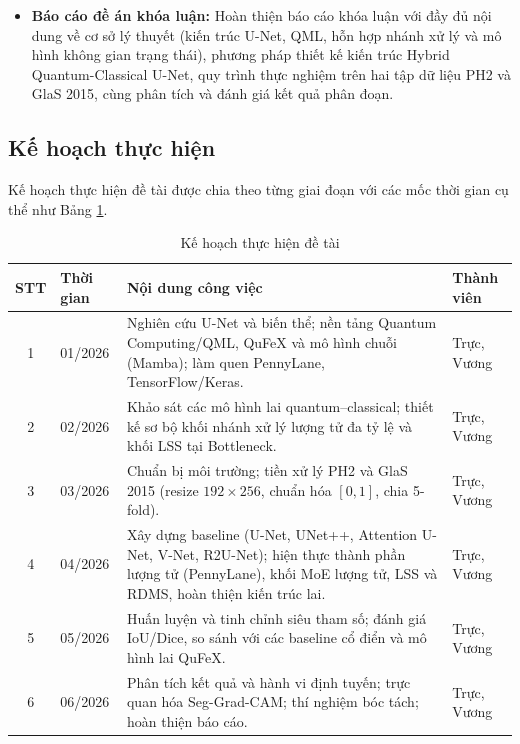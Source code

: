 \documentclass[14pt]{article}  %
\begin{document}
{    \begin{itemize}
        \item \textbf{Báo cáo đề án khóa luận:} Hoàn thiện báo cáo khóa luận với đầy đủ nội dung về cơ sở lý thuyết (kiến trúc U-Net, QML, hỗn hợp nhánh xử lý và mô hình không gian trạng thái), phương pháp thiết kế kiến trúc Hybrid Quantum-Classical U-Net, quy trình thực nghiệm trên hai tập dữ liệu PH2 và GlaS 2015, cùng phân tích và đánh giá kết quả phân đoạn.
    \end{itemize}

    \subsection{Kế hoạch thực hiện}

Kế hoạch thực hiện đề tài được chia theo từng giai đoạn với các mốc thời gian cụ thể như Bảng \ref{tab:plan}.

\begin{table}[H]
\centering
\normalsize
\caption{Kế hoạch thực hiện đề tài}
\label{tab:plan}

\renewcommand{\arraystretch}{1.45}
\setlength{\tabcolsep}{6pt}

\begin{tabular}{|c|p{3.9cm}|p{8cm}|p{3cm}|}
\hline
\textbf{STT} & \textbf{Thời gian} & \textbf{Nội dung công việc} & \textbf{Thành viên} \\
\hline

1 & 01/2026 &
Nghiên cứu U-Net và biến thể; nền tảng Quantum Computing/QML, QuFeX và mô hình chuỗi (Mamba); làm quen PennyLane, TensorFlow/Keras. &
Trực, Vương \\
\hline

2 & 02/2026 &
Khảo sát các mô hình lai quantum--classical; thiết kế sơ bộ khối nhánh xử lý lượng tử đa tỷ lệ và khối LSS tại Bottleneck. &
Trực, Vương \\
\hline

3 & 03/2026 &
Chuẩn bị môi trường; tiền xử lý PH2 và GlaS 2015 (resize $192\times256$, chuẩn hóa $[0,1]$, chia 5-fold). &
Trực, Vương \\
\hline

4 & 04/2026 &
Xây dựng baseline (U-Net, UNet++, Attention U-Net, V-Net, R2U-Net); hiện thực thành phần lượng tử (PennyLane), khối MoE lượng tử, LSS và RDMS, hoàn thiện kiến trúc lai. &
Trực, Vương \\
\hline

5 & 05/2026 &
Huấn luyện và tinh chỉnh siêu tham số; đánh giá IoU/Dice, so sánh với các baseline cổ điển và mô hình lai QuFeX. &
Trực, Vương \\
\hline

6 & 06/2026 &
Phân tích kết quả và hành vi định tuyến; trực quan hóa Seg-Grad-CAM; thí nghiệm bóc tách; hoàn thiện báo cáo. &
Trực, Vương \\
\hline

\end{tabular}

\end{table}


    }
\end{document}
